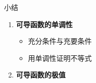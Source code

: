 % 

\begin{frame}[<+->]{小结}
	\linespread{1.5}
	\begin{enumerate}
	  \item {\bf 可导函数的单调性}
	  \begin{itemize}
	    \item 充分条件与充要条件
	    \item 用单调性证明不等式
	  \end{itemize}
	  \item {\bf 可导函数的极值}
	\end{enumerate}
\end{frame}


